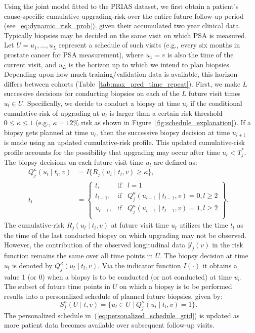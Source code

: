Using the joint model fitted to the PRIAS dataset, we first obtain a patient's cause-specific cumulative upgrading-risk over the entire future follow-up period (see~\ref{eq:dynamic_risk_prob}), given their accumulated two year clinical data. Typically biopsies may be decided on the same visit on which PSA is measured. Let $U={u_1, \ldots, u_L}$ represent a schedule of such visits (e.g., every six months in prostate cancer for PSA measurement), where $u_1=v$ is also the time of the current visit, and $u_L$ is the horizon up to which we intend to plan biopsies. Depending upon how much training/validation data is available, this horizon differs between cohorts (Table~\ref{tab:max_pred_time_repeat}). First, we make $L$ successive decisions for conducting biopsies on each of the $L$ future visit times $u_l \in U$. Specifically, we decide to conduct a biopsy at time $u_l$ if the conditional cumulative-risk of upgrading at $u_l$ is larger than a certain risk threshold $0 \leq \kappa \leq 1$ (e.g., $\kappa=12$\% risk as shown in Figure~\ref{fig:schedule_explanation}). If a biopsy gets planned at time $u_l$, then the successive biopsy decision at time $u_{l+1}$ is made using an updated cumulative-risk profile. This updated cumulative-risk profile accounts for the possibility that upgrading may occur after time $u_l < T^*_j$. The biopsy decisions on each future visit time $u_l$ are defined as: 
\begin{equation*}
\label{eq:personalized_decision_grid}
\begin{split}
Q_j^{\kappa}(u_l \mid t_l, v) &= I\big\{R_j(u_l \mid t_l, v) \geq \kappa \big\},\\
t_l &= \left\{\begin{array}{lcr}
  t, &\mbox{if}& l=1\\
  t_{l-1}, &\mbox{if}&  Q_j^{\kappa}(u_{l-1} \mid t_{l-1}, v)=0, l\geq 2\\ 
  u_{l-1}, &\mbox{if}&  Q_j^{\kappa}(u_{l-1} \mid t_{l-1}, v)=1, l\geq 2\\
\end{array} \right\}.
\end{split}
\end{equation*}
The cumulative-risk $R_j(u_l \mid t_l, v)$ at future visit time $u_l$ utilizes the time $t_l$ as the time of the last conducted biopsy on which upgrading may not be observed. However, the contribution of the observed longitudinal data $\mathcal{Y}_{j}(v)$ in the risk function remains the same over all time points in $U$. The biopsy decision at time $u_l$ is denoted by ${Q_j^{\kappa}(u_l \mid t_l, v)}$. Via the indicator function $I(\cdot)$ it obtains a value 1 (or 0) when a biopsy is to be conducted (or not conducted) at time $u_l$. The subset of future time points in $U$ on which a biopsy is to be performed results into a personalized schedule of planned future biopsies, given by:
\begin{equation}
\label{eq:personalized_schedule_grid}
S_j^{\kappa}(U \mid t, v) = \big\{ u_l \in U \mid Q_j^{\kappa}(u_l \mid t_l, v)=1\big\}.
\end{equation}
The personalized schedule in~(\ref{eq:personalized_schedule_grid}) is updated as more patient data becomes available over subsequent follow-up visits.

